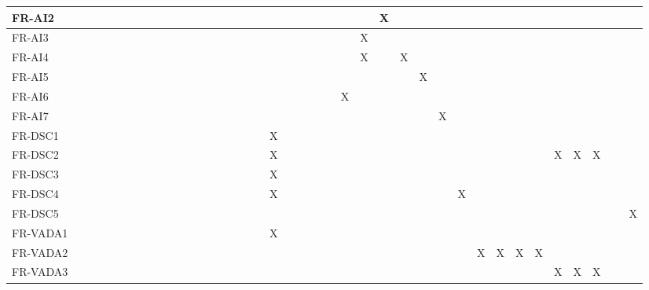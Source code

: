 \documentclass[12pt]{article}
\begin{document}
\begin{table}[!ht]
{\begin{tabular}{|l|l|l|l|l|l|l|l|l|l|l|l|l|l|l|l|l|l|l|l|l|l|l|l|l|l|l|l|l|l|l|l|}
      FR-AI2 & ~ & ~ & ~ & ~ & ~ & ~ & ~ & ~ & ~ & ~ & ~ & ~ & ~ & ~ & ~ & ~ & ~ & X & ~ & ~ & ~ & ~ & ~ & ~ & ~ & ~ & ~ & ~ & ~ & ~ & ~ \\ \hline
      FR-AI3 & ~ & ~ & ~ & ~ & ~ & ~ & ~ & ~ & ~ & ~ & ~ & ~ & ~ & ~ & ~ & ~ & X & ~ & ~ & ~ & ~ & ~ & ~ & ~ & ~ & ~ & ~ & ~ & ~ & ~ & ~ \\ \hline
      FR-AI4 & ~ & ~ & ~ & ~ & ~ & ~ & ~ & ~ & ~ & ~ & ~ & ~ & ~ & ~ & ~ & ~ & X & ~ & X & ~ & ~ & ~ & ~ & ~ & ~ & ~ & ~ & ~ & ~ & ~ & ~ \\ \hline
      FR-AI5 & ~ & ~ & ~ & ~ & ~ & ~ & ~ & ~ & ~ & ~ & ~ & ~ & ~ & ~ & ~ & ~ & ~ & ~ & ~ & X & ~ & ~ & ~ & ~ & ~ & ~ & ~ & ~ & ~ & ~ & ~ \\ \hline
      FR-AI6 & ~ & ~ & ~ & ~ & ~ & ~ & ~ & ~ & ~ & ~ & ~ & ~ & ~ & ~ & ~ & X & ~ & ~ & ~ & ~ & ~ & ~ & ~ & ~ & ~ & ~ & ~ & ~ & ~ & ~ & ~ \\ \hline
      FR-AI7 & ~ & ~ & ~ & ~ & ~ & ~ & ~ & ~ & ~ & ~ & ~ & ~ & ~ & ~ & ~ & ~ & ~ & ~ & ~ & ~ & X & ~ & ~ & ~ & ~ & ~ & ~ & ~ & ~ & ~ & ~ \\ \hline
      FR-DSC1 & ~ & ~ & ~ & ~ & ~ & ~ & ~ & ~ & ~ & ~ & ~ & X & ~ & ~ & ~ & ~ & ~ & ~ & ~ & ~ & ~ & ~ & ~ & ~ & ~ & ~ & ~ & ~ & ~ & ~ & ~ \\ \hline
      FR-DSC2 & ~ & ~ & ~ & ~ & ~ & ~ & ~ & ~ & ~ & ~ & ~ & X & ~ & ~ & ~ & ~ & ~ & ~ & ~ & ~ & ~ & ~ & ~ & ~ & ~ & ~ & X & X & X & ~ & ~ \\ \hline
      FR-DSC3 & ~ & ~ & ~ & ~ & ~ & ~ & ~ & ~ & ~ & ~ & ~ & X & ~ & ~ & ~ & ~ & ~ & ~ & ~ & ~ & ~ & ~ & ~ & ~ & ~ & ~ & ~ & ~ & ~ & ~ & ~ \\ \hline
      FR-DSC4 & ~ & ~ & ~ & ~ & ~ & ~ & ~ & ~ & ~ & ~ & ~ & X & ~ & ~ & ~ & ~ & ~ & ~ & ~ & ~ & ~ & X & ~ & ~ & ~ & ~ & ~ & ~ & ~ & ~ & ~ \\ \hline
      FR-DSC5 & ~ & ~ & ~ & ~ & ~ & ~ & ~ & ~ & ~ & ~ & ~ & ~ & ~ & ~ & ~ & ~ & ~ & ~ & ~ & ~ & ~ & ~ & ~ & ~ & ~ & ~ & ~ & ~ & ~ & ~ & X \\ \hline
      FR-VADA1 & ~ & ~ & ~ & ~ & ~ & ~ & ~ & ~ & ~ & ~ & ~ & X & ~ & ~ & ~ & ~ & ~ & ~ & ~ & ~ & ~ & ~ & ~ & ~ & ~ & ~ & ~ & ~ & ~ & ~ & ~ \\ \hline
      FR-VADA2 & ~ & ~ & ~ & ~ & ~ & ~ & ~ & ~ & ~ & ~ & ~ & ~ & ~ & ~ & ~ & ~ & ~ & ~ & ~ & ~ & ~ & ~ & X & X & X & X & ~ & ~ & ~ & ~ & ~ \\ \hline
      FR-VADA3 & ~ & ~ & ~ & ~ & ~ & ~ & ~ & ~ & ~ & ~ & ~ & ~ & ~ & ~ & ~ & ~ & ~ & ~ & ~ & ~ & ~ & ~ & ~ & ~ & ~ & ~ & X & X & X & ~ & ~ \\ \hline

\end{tabular}}
\end{table}
\end{document}
